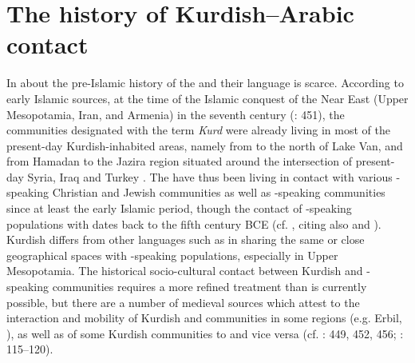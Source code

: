 \documentclass[output=paper]{langsci/langscibook}
\begin{document}
\section{The history of Kurdish–Arabic contact} 

In about the pre-Islamic history of the  and their language is scarce. According to early Islamic sources, at the time of the Islamic conquest of the Near East (Upper Mesopotamia, Iran, and Armenia) in the seventh century (\citealt{BoisEtAl2012}: 451), the communities designated with the term \textit{Kurd} were already living in most of the present-day Kurdish-inhabited areas, namely from  to the north of Lake Van, and from Hamadan to the Jazira region situated around the intersection of present-day Syria, Iraq and Turkey \citep[111]{James2007}. The  have thus been living in contact with various -speaking Christian and Jewish communities as well as -speaking communities since at least the early Islamic period, though the contact of -speaking populations with  dates back to the fifth century BCE (cf. \citealt[69]{Utas2005}, citing also \citealt{Folmer1995} and \citealt{Kent1953}). Kurdish differs from other  languages such as  in sharing the same or close geographical spaces with -speaking populations, especially in Upper Mesopotamia. The historical socio-cultural contact between Kurdish and -speaking communities requires a more refined treatment than is currently possible, but there are a number of medieval  sources which attest to the interaction and mobility of Kurdish and  communities in some regions (e.g. Erbil, ), as well as  of some Kurdish communities to  and vice versa (cf. \citealt{BoisEtAl2012}: 449, 452, 456; \citealt{James2007}: 115–120). 
\end{document}
